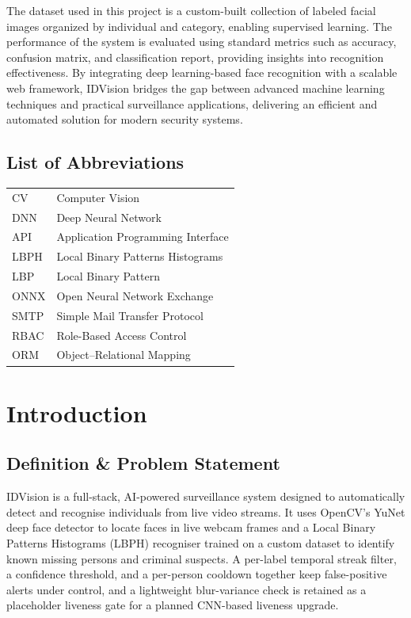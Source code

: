 \documentclass[11pt]{report}
\begin{document}
\begin{titlepage}
The dataset used in this project is a custom-built collection of labeled facial images organized by individual and category, enabling supervised learning. The performance of the system is evaluated using standard metrics such as accuracy, confusion matrix, and classification report, providing insights into recognition effectiveness. By integrating deep learning-based face recognition with a scalable web framework, IDVision bridges the gap between advanced machine learning techniques and practical surveillance applications, delivering an efficient and automated solution for modern security systems.
\end{titlepage}

\tableofcontents
\cleardoublepage
{}
\listoffigures
\cleardoublepage
{}
\listoftables
\cleardoublepage

\section*{List of Abbreviations}

\begin{tabular}{ll}
CV & Computer Vision \\
DNN & Deep Neural Network \\
API & Application Programming Interface \\
LBPH & Local Binary Patterns Histograms \\
LBP & Local Binary Pattern \\
ONNX & Open Neural Network Exchange \\
SMTP & Simple Mail Transfer Protocol \\
RBAC & Role-Based Access Control \\
ORM & Object--Relational Mapping \\
\end{tabular}

\newpage


\chapter{Introduction}
\section{Definition \& Problem Statement}
IDVision is a full-stack, AI-powered surveillance system designed to automatically detect and recognise individuals from live video streams. It uses OpenCV's YuNet deep face detector to locate faces in live webcam frames and a Local Binary Patterns Histograms (LBPH) recogniser trained on a custom dataset to identify known missing persons and criminal suspects. A per-label temporal streak filter, a confidence threshold, and a per-person cooldown together keep false-positive alerts under control, and a lightweight blur-variance check is retained as a placeholder liveness gate for a planned CNN-based liveness upgrade.
\end{document}
